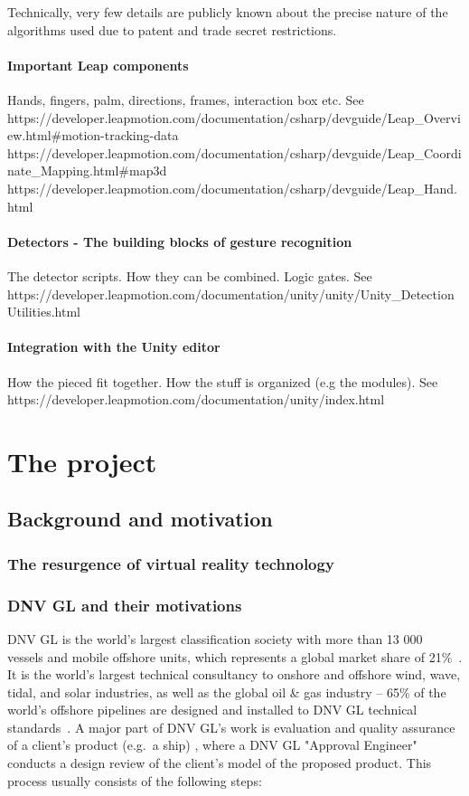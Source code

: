 \documentclass[UKenglish]{ifimaster}
\begin{document}
Technically, very few details are publicly known about the precise nature of the algorithms used due to patent and trade secret restrictions.

\subsection{Important Leap components}
Hands, fingers, palm, directions, frames, interaction box etc. See 
https://developer.leapmotion.com/documentation/csharp/devguide/Leap\_Overview.html\#motion-tracking-data
https://developer.leapmotion.com/documentation/csharp/devguide/Leap\_Coordinate\_Mapping.html\#map3d
https://developer.leapmotion.com/documentation/csharp/devguide/Leap\_Hand.html


\subsection{Detectors - The building blocks of gesture recognition}
The detector scripts. How they can be combined. Logic gates. 
See https://developer.leapmotion.com/documentation/unity/unity/Unity\_DetectionUtilities.html

\subsection{Integration with the Unity editor}
How the pieced fit together. How the stuff is organized (e.g the modules).
See https://developer.leapmotion.com/documentation/unity/index.html


\part{The project} 

\chapter{Background and motivation}

\section{The resurgence of virtual reality technology}

\section{DNV GL and their motivations}
DNV GL is the world's largest classification society with more than 13 000 vessels and mobile offshore units, which represents a global market share of 21\%~\citep{TO:DNVGL}. It is the world's largest technical consultancy to onshore and offshore wind, wave, tidal, and solar industries, as well as the global oil \& gas industry -- 65\% of the world’s offshore pipelines are designed and installed to DNV GL technical standards~\citep{MTN:DNVGL}. A major part of DNV GL's work is evaluation and quality assurance of a client's product (e.g.~a ship) , where a DNV GL "Approval Engineer" conducts a design review of the client's model of the proposed product. This process usually consists of the following steps: 
\end{document}
